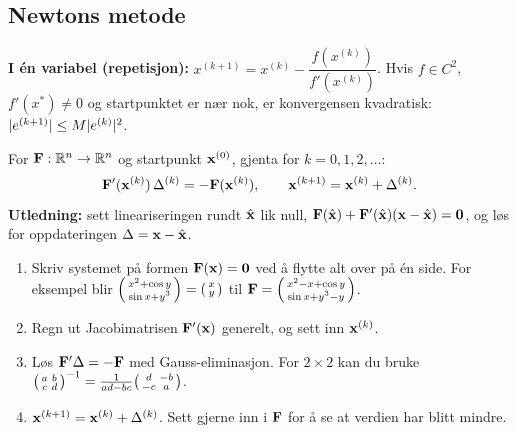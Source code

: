 \subsection{Newtons metode}
\textbf{I én variabel (repetisjon):} $x^{(k+1)}=x^{(k)}-\dfrac{f(x^{(k)})}{f'(x^{(k)})}$. Hvis $f\in C^2$, $f'(x^*)\neq0$ og startpunktet er nær nok, er konvergensen kvadratisk: $\lvert e^{(k+1)}\rvert\le M\lvert e^{(k)}\rvert^2$.

\begin{formel}
For $\mathbf{F}:\mathbb{R}^n\to\mathbb{R}^n$ og startpunkt $\mathbf{x}^{(0)}$, gjenta for $k=0,1,2,\dots$:
\[
\mathbf{F}'(\mathbf{x}^{(k)})\,\Delta^{(k)}=-\mathbf{F}(\mathbf{x}^{(k)}),\qquad \mathbf{x}^{(k+1)}=\mathbf{x}^{(k)}+\Delta^{(k)}.
\]
\textbf{Utledning:} sett lineariseringen rundt $\hat{\mathbf{x}}$ lik null, $\mathbf{F}(\hat{\mathbf{x}})+\mathbf{F}'(\hat{\mathbf{x}})(\mathbf{x}-\hat{\mathbf{x}})=\mathbf{0}$, og løs for oppdateringen $\Delta=\mathbf{x}-\hat{\mathbf{x}}$.
\end{formel}

\begin{oppskrift}
\begin{enumerate}
  \item Skriv systemet på formen $\mathbf{F}(\mathbf{x})=\mathbf{0}$ ved å flytte alt over på én side. For eksempel blir $\begin{psmallmatrix}x^2+\cos y\\ \sin x+y^3\end{psmallmatrix}=\begin{psmallmatrix}x\\y\end{psmallmatrix}$ til $\mathbf{F}=\begin{psmallmatrix}x^2-x+\cos y\\ \sin x+y^3-y\end{psmallmatrix}$.
  \item Regn ut Jacobimatrisen $\mathbf{F}'(\mathbf{x})$ generelt, og sett inn $\mathbf{x}^{(k)}$.
  \item Løs $\mathbf{F}'\Delta=-\mathbf{F}$ med Gauss-eliminasjon. For $2\times2$ kan du bruke $\begin{psmallmatrix}a&b\\c&d\end{psmallmatrix}^{-1}=\frac{1}{ad-bc}\begin{psmallmatrix}d&-b\\-c&a\end{psmallmatrix}$.
  \item $\mathbf{x}^{(k+1)}=\mathbf{x}^{(k)}+\Delta^{(k)}$. Sett gjerne inn i $\mathbf{F}$ for å se at verdien har blitt mindre.
\end{enumerate}
\end{oppskrift}


